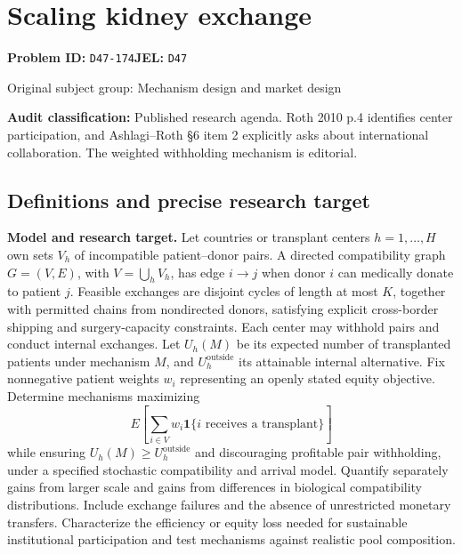 \documentclass[11pt,a4paper]{article}
\begin{document}
\section*{Scaling kidney exchange}
\textbf{Problem ID:} \texttt{D47-174}\quad \textbf{JEL:} \texttt{D47}\par
\label{problem:OP-0298}
{\sffamily\small\color{muted}Original subject group: Mechanism design and market design\par}
\label{definitions:problem:30007580}
\textbf{Audit classification:} Published research agenda. Roth 2010 p.4 identifies center participation, and Ashlagi–Roth §6 item 2 explicitly asks about international collaboration. The weighted withholding mechanism is editorial.
\subsection*{Definitions and precise research target}
\textbf{Model and research target.} Let countries or transplant centers \(h=1,\ldots,H\) own sets \(V_h\) of incompatible patient–donor pairs. A directed compatibility graph \(G=(V,E)\), with \(V=\bigcup_hV_h\), has edge \(i\to j\) when donor \(i\) can medically donate to patient \(j\). Feasible exchanges are disjoint cycles of length at most \(K\), together with permitted chains from nondirected donors, satisfying explicit cross-border shipping and surgery-capacity constraints. Each center may withhold pairs and conduct internal exchanges. Let \(U_h(M)\) be its expected number of transplanted patients under mechanism \(M\), and \(U_h^{\mathrm{outside}}\) its attainable internal alternative. Fix nonnegative patient weights \(w_i\) representing an openly stated equity objective. Determine mechanisms maximizing
\[
 E\left[\sum_{i\in V}w_i\mathbf1\{i\text{ receives a transplant}\}\right]
\]
while ensuring \(U_h(M)\geq U_h^{\mathrm{outside}}\) and discouraging profitable pair withholding, under a specified stochastic compatibility and arrival model. Quantify separately gains from larger scale and gains from differences in biological compatibility distributions. Include exchange failures and the absence of unrestricted monetary transfers. Characterize the efficiency or equity loss needed for sustainable institutional participation and test mechanisms against realistic pool composition.
\end{document}
